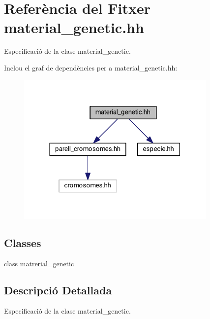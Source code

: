 \hypertarget{material__genetic_8hh}{}\section{Referència del Fitxer material\+\_\+genetic.\+hh}
\label{material__genetic_8hh}


Especificació de la clase material\+\_\+genetic.  


Inclou el graf de dependències per a material\+\_\+genetic.\+hh\+:\nopagebreak
\begin{figure}[H]
\begin{center}
\leavevmode
\includegraphics[width=278pt]{material__genetic_8hh__incl}
\end{center}
\end{figure}
\subsection*{Classes}
\begin{DoxyCompactItemize}
\item 
class \hyperlink{classmatrerial__genetic}{matrerial\+\_\+genetic}
\end{DoxyCompactItemize}


\subsection{Descripció Detallada}
Especificació de la clase material\+\_\+genetic. 

